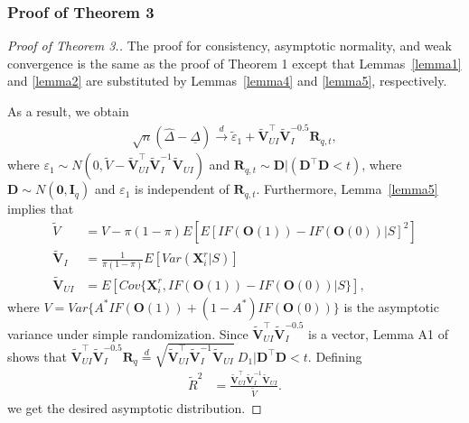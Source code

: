 \documentclass[12pt]{article}
\newcommand{\bX}{\boldsymbol{X}}
\newcommand{\bO}{\boldsymbol{O}}
\newcommand{\bR}{\boldsymbol{R}}
\newcommand{\bD}{\boldsymbol{D}}
\newcommand{\bzero}{\boldsymbol{0}}
\newcommand{\bfV}{\mathbf{V}}
\begin{document}
\subsubsection{Proof of Theorem 3}
\begin{proof}[Proof of Theorem 3.]
The proof for consistency, asymptotic normality, and weak convergence is the same as the proof of Theorem 1 except that Lemmas~\ref{lemma1} and \ref{lemma2} are substituted by Lemmas~\ref{lemma4} and \ref{lemma5}, respectively. 

As a result, we obtain 
\begin{align*}
    \sqrt{n}(\widehat{\Delta} - \underline{\Delta}) \xrightarrow{d} \widetilde{\varepsilon}_1 + \widetilde{\bfV}_{UI}^\top \widetilde{\bfV}_I^{-0.5} \bR_{q,t},
\end{align*}
where $\varepsilon_1 \sim N(0, \widetilde{V}-\widetilde{\bfV}_{UI}^\top \widetilde{\bfV}_I^{-1}\widetilde{\bfV}_{UI})$ and $\bR_{q,t} \sim  \bD|( \bD^\top  \bD < t)$,  where $\bD \sim N(\bzero, \mathbf{I}_q)$ and $\varepsilon_1$ is independent of $\bR_{q,t}$.
Furthermore, Lemma~\ref{lemma5} implies that
\begin{align*}
    \widetilde{V} &= V - \pi(1-\pi) E[E[IF(\bO(1)) - IF(\bO(0))|S]^2] \\
    \widetilde{\bfV}_I &= \frac{1}{\pi(1-\pi)}E[Var(\bX_i^r|S)] \\
    \widetilde{\bfV}_{UI} &= E[Cov\{\bX_i^r, IF(\bO(1)) - IF(\bO(0))|S\}],
\end{align*}
where $V = Var\{A^* IF(\bO(1))+(1-A^*)IF(\bO(0))\}$ is the asymptotic variance under simple randomization. Since $\widetilde{\bfV}_{UI}^\top \widetilde{\bfV}_I^{-0.5}$ is a vector, Lemma A1 of \cite{li2018asymptotic} shows that $\widetilde{\bfV}_{UI}^\top \widetilde{\bfV}_I^{-0.5} \bR_q \overset{d}{=} \sqrt{\widetilde{\bfV}_{UI}^\top \widetilde{\bfV}_I^{-1} \widetilde{\bfV}_{UI}}\ D_1|\bD^\top \bD < t$. Defining
\begin{align*}
    \widetilde{R}^2 &= \frac{\widetilde{\bfV}_{UI}^\top \widetilde{\bfV}_I^{-1} \widetilde{\bfV}_{UI}}{\widetilde{V}}.
\end{align*}
we get the desired asymptotic distribution. 


\end{proof}
\end{document}

